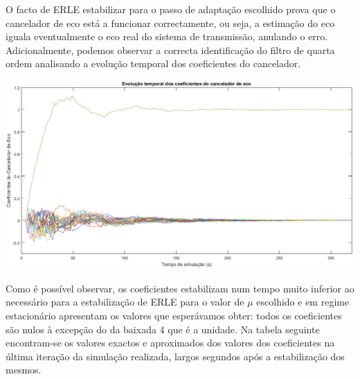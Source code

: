 \documentclass[a4paper,11pt]{report}
\begin{document}
O facto de ERLE estabilizar para o passo de adaptação escolhido prova que o cancelador de eco está a funcionar correctamente, ou seja, a estimação do eco iguala eventualmente o eco real do sistema de transmissão, anulando o erro. Adicionalmente, podemos observar a correcta identificação do filtro de quarta ordem analisando a evolução temporal dos coeficientes do cancelador.

\begin{center}
     \includegraphics[angle=0,width=1\textwidth]{testecanceladorCoef.png}
     \label{fig:testecanceladorCoef}
     \end{center}

Como é possível observar, os coeficientes estabilizam num tempo muito inferior ao necessário para a estabilização de ERLE para o valor de $\mu$ escolhido e em regime estacionário apresentam os valores que esperávamos obter: todos os coeficientes são nulos à excepção do da baixada 4 que é a unidade. Na tabela seguinte encontram-se os valores exactos e aproximados dos valores dos coeficientes na última iteração da simulação realizada, largos segundos após a estabilização dos mesmos.
\end{document}
